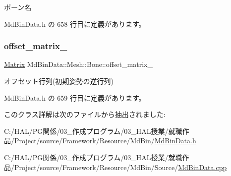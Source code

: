 ボーン名 



 Md\+Bin\+Data.\+h の 658 行目に定義があります。

\mbox{\label{class_md_bin_data_1_1_mesh_1_1_bone_ab2119901317e2beb384a36d40f31c385}} 
\subsubsection{\texorpdfstring{offset\+\_\+matrix\+\_\+}{offset\_matrix\_}}
{\footnotesize\ttfamily \mbox{\hyperlink{class_md_bin_data_1_1_matrix}{Matrix}} Md\+Bin\+Data\+::\+Mesh\+::\+Bone\+::offset\+\_\+matrix\+\_\+\hspace{0.3cm}{\ttfamily [private]}}



オフセット行列(初期姿勢の逆行列) 



 Md\+Bin\+Data.\+h の 659 行目に定義があります。



このクラス詳解は次のファイルから抽出されました\+:\begin{DoxyCompactItemize}
\item 
C\+:/\+H\+A\+L/\+P\+G関係/03\+\_\+作成プログラム/03\+\_\+\+H\+A\+L授業/就職作品/\+Project/source/\+Framework/\+Resource/\+Md\+Bin/\mbox{\hyperlink{_md_bin_data_8h}{Md\+Bin\+Data.\+h}}\item 
C\+:/\+H\+A\+L/\+P\+G関係/03\+\_\+作成プログラム/03\+\_\+\+H\+A\+L授業/就職作品/\+Project/source/\+Framework/\+Resource/\+Md\+Bin/\+Source/\mbox{\hyperlink{_md_bin_data_8cpp}{Md\+Bin\+Data.\+cpp}}\end{DoxyCompactItemize}
